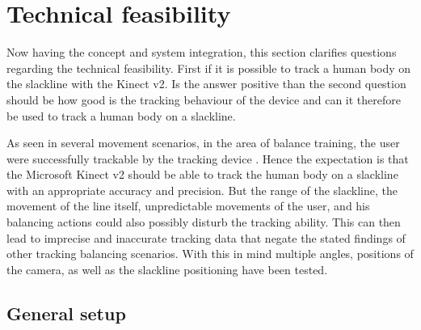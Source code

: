 \section{Technical feasibility}\label{5_3_technicalFeasibility}
Now having the concept and system integration, this section clarifies questions regarding the technical feasibility. First if it is possible to track a human body on the slackline with the Kinect v2. Is the answer positive than the second question should be how good is the tracking behaviour of the device and can it therefore be used to track a human body on a slackline.

As seen in several movement scenarios, in the area of balance training, the user were successfully trackable by the tracking device \textbf{\todo{[CITE]}}. Hence the expectation is that the Microsoft Kinect v2 should be able to track the human body on a slackline with an appropriate accuracy and precision. But the range of the slackline, the movement of the line itself, unpredictable movements of the user, and his balancing actions could also possibly disturb the tracking ability. This can then lead to imprecise and inaccurate tracking data that negate the stated findings of other tracking balancing scenarios. With this in mind multiple angles, positions of the camera, as well as the slackline positioning have been tested.

\subsection{General setup} %

